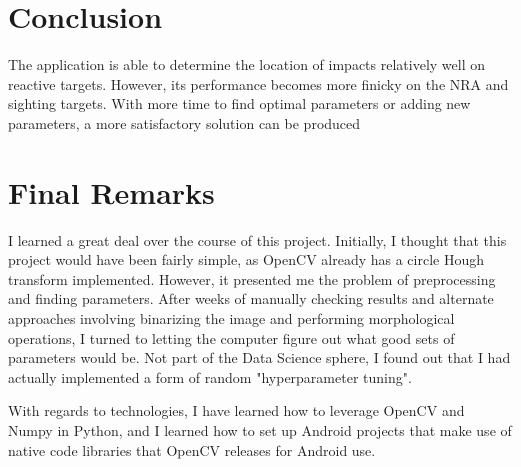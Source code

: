 \documentclass{article}
\begin{document}
\section{Conclusion}
\label{sec:conclusion}
The application is able to determine the location of impacts relatively well on reactive targets.
However, its performance becomes more finicky on the NRA and sighting targets. With more time
to find optimal parameters or adding new parameters, a more satisfactory solution can be produced

\section{Final Remarks}
\label{sec:remarks}
I learned a great deal over the course of this project. Initially, I thought that this project
would have been fairly simple, as OpenCV already has a circle Hough transform implemented.
However, it presented me the problem of preprocessing and finding parameters.
After weeks of manually checking results and alternate approaches involving 
binarizing the image and performing morphological operations,
I turned to letting the computer figure out what good sets of parameters would be. Not part of
the Data Science sphere, I found out that I had actually implemented a form of random
"hyperparameter tuning".

With regards to technologies, I have learned how to leverage OpenCV and Numpy in Python, and I
learned how to set up Android projects that make use of native code libraries that OpenCV
releases for Android use.



\end{document}
